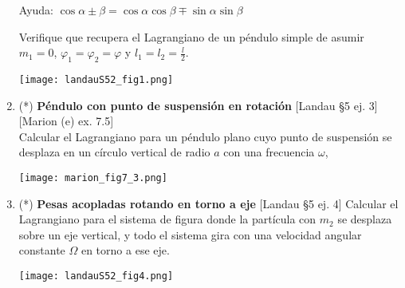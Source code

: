 \documentclass[11pt,spanish,a4paper]{article}
\begin{document}
\begin{enumerate}
\begin{minipage}[t][4.5cm]{0.7\textwidth}
Ayuda: \( \cos{\alpha \pm \beta }=\cos{ \alpha} \cos{ \beta \mp \sin \alpha} \sin{ \beta } \)

Verifique que recupera el Lagrangiano de un péndulo simple de asumir \(m_1=0\), \(\varphi_1 = \varphi_2 = \varphi\) y \(l_1 = l_2 = \frac{l}{2}\).
\end{minipage}
	\begin{minipage}[c][2.5cm][t]{0.3\textwidth}
	\texttt{[image: landauS52\_fig1.png]}
\end{minipage}



\item \begin{minipage}[t][4.5cm]{0.7\textwidth}
(*) \textbf{Péndulo con punto de suspensión en rotación} [Landau \S5 ej. 3] [Marion (e) ex. 7.5]\\
Calcular el Lagrangiano para un péndulo plano cuyo punto de suspensión se desplaza en un círculo vertical de radio \(a\) con una frecuencia \(\omega\),
\end{minipage}
	\begin{minipage}[c][2.5cm][t]{0.3\textwidth}
	\texttt{[image: marion\_fig7\_3.png]}
\end{minipage}



\item \begin{minipage}[t][4.5cm]{0.7\textwidth}
(*) \textbf{Pesas acopladas rotando en torno a eje} [Landau \S5 ej. 4]
Calcular el Lagrangiano para el sistema de figura donde la partícula con \(m_2\) se desplaza sobre un eje vertical, y todo el sistema gira con una velocidad angular constante \(\Omega\) en torno a ese eje.
\end{minipage}
	\begin{minipage}[c][2.5cm][t]{0.3\textwidth}
	\texttt{[image: landauS52\_fig4.png]}
\end{minipage}



\end{enumerate}
\end{document}
